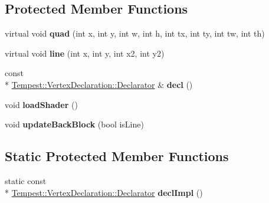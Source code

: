 \subsection*{Protected Member Functions}
\begin{DoxyCompactItemize}
\item 
\hypertarget{class_tempest_1_1_surface_render_a39b052f6ae5104f42ca4437fc7dbc385}{virtual void {\bfseries quad} (int x, int y, int w, int h, int tx, int ty, int tw, int th)}\label{class_tempest_1_1_surface_render_a39b052f6ae5104f42ca4437fc7dbc385}

\item 
\hypertarget{class_tempest_1_1_surface_render_a394192aaa4df03f468bc52a98cae830b}{virtual void {\bfseries line} (int x, int y, int x2, int y2)}\label{class_tempest_1_1_surface_render_a394192aaa4df03f468bc52a98cae830b}

\item 
\hypertarget{class_tempest_1_1_surface_render_abca55bb910d03e20fd8b95259b8a3ed9}{const \\*
\hyperlink{class_tempest_1_1_vertex_declaration_1_1_declarator}{Tempest\+::\+Vertex\+Declaration\+::\+Declarator} \& {\bfseries decl} ()}\label{class_tempest_1_1_surface_render_abca55bb910d03e20fd8b95259b8a3ed9}

\item 
\hypertarget{class_tempest_1_1_surface_render_a7d2f3aabc781c0030846186eea2e231e}{void {\bfseries load\+Shader} ()}\label{class_tempest_1_1_surface_render_a7d2f3aabc781c0030846186eea2e231e}

\item 
\hypertarget{class_tempest_1_1_surface_render_a5d491518534c0067c5fbe915e6e6433d}{void {\bfseries update\+Back\+Block} (bool is\+Line)}\label{class_tempest_1_1_surface_render_a5d491518534c0067c5fbe915e6e6433d}

\end{DoxyCompactItemize}
\subsection*{Static Protected Member Functions}
\begin{DoxyCompactItemize}
\item 
\hypertarget{class_tempest_1_1_surface_render_a688d7989d03469989c962239e4d17ef0}{static const \\*
\hyperlink{class_tempest_1_1_vertex_declaration_1_1_declarator}{Tempest\+::\+Vertex\+Declaration\+::\+Declarator} {\bfseries decl\+Impl} ()}\label{class_tempest_1_1_surface_render_a688d7989d03469989c962239e4d17ef0}

\end{DoxyCompactItemize}
